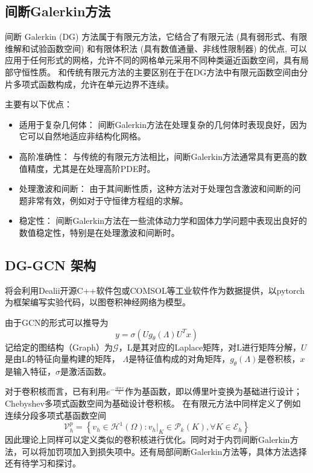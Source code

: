 \subsection{间断Galerkin方法\cite{20130601}}

间断 Galerkin (DG) 方法属于有限元方法，它结合了有限元法 (具有弱形式、有限维解和试验函数空间) 和有限体积法 (具有数值通量、非线性限制器) 的优点, 
可以应用于任何形式的网格，允许不同的网格单元采用不同种类逼近函数空间，具有局部守恒性质。
和传统有限元方法的主要区别在于在DG方法中有限元函数空间由分片多项式函数构成，允许在单元边界不连续。

主要有以下优点：
\begin{itemize}
    \item 适用于复杂几何体： 间断Galerkin方法在处理复杂的几何体时表现良好，因为它可以自然地适应非结构化网格。
    \item 高阶准确性： 与传统的有限元方法相比，间断Galerkin方法通常具有更高的数值精度，尤其是在处理高阶PDE时。
    \item 处理激波和间断： 由于其间断性质，这种方法对于处理包含激波和间断的问题非常有效，例如对于守恒律方程组的求解。
    \item 稳定性： 间断Galerkin方法在一些流体动力学和固体力学问题中表现出良好的数值稳定性，特别是在处理激波和间断时。
    
\end{itemize}

\subsection{DG-GCN 架构}
将会利用Dealii开源C++软件包或COMSOL等工业软件作为数据提供，以pytorch为框架编写实验代码，以图卷积神经网络为模型。

由于GCN的形式可以推导为$$y=\sigma (Ug_{\theta}(\Lambda)U^Tx)$$记给定的图结构（Graph）为$\mathscr{G}$，L是其对应的Laplace矩阵，对L进行矩阵分解，$U$是由L的特征向量构建的矩阵， 
$\Lambda$是特征值构成的对角矩阵，$g_{\theta}(\Lambda)$是卷积核，$x$是输入特征，$\sigma$是激活函数。

对于卷积核而言，已有利用$e^{-\frac{ik\pi x}{L}}$作为基函数，即以傅里叶变换为基础进行设计；Chebyshev多项式函数空间为基础设计卷积核。
在有限元方法中同样定义了例如连续分段多项式基函数空间
$$\mathcal{V}_{h}^{p}=\left\{v_h \in\mathcal{H}^{1}(\Omega):v_h|_{K} \in \mathcal{P}_{k}(K), \forall K \in \mathcal{E}_{h}\right\}$$
因此理论上同样可以定义类似的卷积核进行优化。同时对于内罚间断Galerkin方法，可以将加罚项加入到损失项中。还有局部间断Galerkin方法等，具体方法选择还有待学习和探讨。


